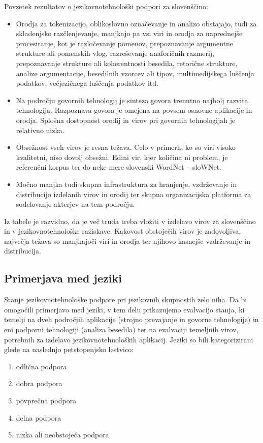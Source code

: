 \begin{multicols}{2}
Povzetek rezultatov o jezikovnotehnološki podpori za slovenščino:

\begin{itemize}
\item Orodja za tokenizacijo, oblikoslovno označevanje in analizo obstajajo, tudi za skladenjsko razčlenjevanje, manjkajo pa vsi viri in orodja za naprednejše procesiranje, kot je razločevanje pomenov, prepoznavanje argumentne strukture ali pomenskih vlog, razreševanje anaforičnih razmerij, prepoznavanje strukture ali koherentnosti besedila, retorične strukture, analize argumentacije, besedilnih vzorcev ali tipov, multimedijskega luščenja podatkov, večjezičnega luščenja podatkov itd. 
\item Na področju govornih tehnologij je sinteza govora trenutno najbolj razvita tehnologija. Razpoznava govora je  omejena na povsem osnovne aplikacije in orodja. Splošna dostopnost orodij in virov pri govornih tehnologijah je relativno nizka.
\item Obsežnost vseh virov je resna težava. Celo v primerh, ko so viri visoko kvalitetni, niso dovolj obsežni. Edini vir, kjer količina ni problem, je referenčni korpus ter do neke mere slovenski WordNet -- sloWNet.
\item Močno manjka tudi skupna infrastruktura za hranjenje, vzdrževanje in distribucijo izdelanih virov in orodij ter skupna organizacijska platforma za sodelovanje akterjev na tem področju.
\end{itemize}

Iz tabele je razvidno, da je več truda treba vložiti v izdelavo virov  za slovenščino in v jezikovnotehnološke raziskave. Kakovost obstoječih virov je zadovoljiva, 
največja težava so manj\-kajoči viri in orodja ter njihovo kasnejše vzdrževanje in distribucija.

\subsection{Primerjava med jeziki}

Stanje jezikovnotehnološke podpore pri jezikovnih skupnostih zelo niha. Da bi omogočili primerjavo med jeziki, v tem delu prikazujemo evalvacijo stanja, ki temelji na dveh področjih aplikacije (strojno prevajanje in govorne tehnologije) in eni podporni tehnologiji (analiza besedila) ter na evalvaciji temeljnih virov, potrebnih za izdelavo jezikovnotehnoloških aplikacij. Jeziki so bili kategorizirani glede na naslednjo petstopenjsko lestvico:

\begin{enumerate}
\item odlična podpora
\item dobra podpora
\item povprečna podpora
\item delna podpora
\item nizka ali neobstoječa podpora
\end{enumerate}


\end{multicols}
